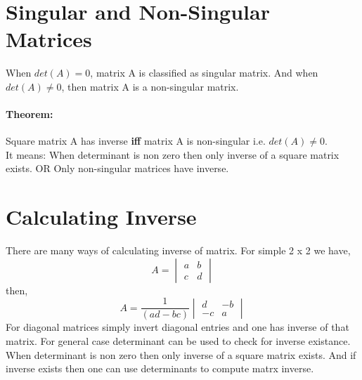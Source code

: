 \documentclass{article}
\begin{document}
\section{Singular and Non-Singular Matrices}
When $det(A)=0$, matrix A is classified as singular matrix. And when $det(A) \neq 0$, then matrix A is a non-singular matrix.
\paragraph{Theorem:}
Square matrix A has inverse \textbf{iff} matrix A is non-singular i.e. $det(A) \neq 0$.\\
It means: When determinant is non zero then only inverse of a square matrix exists. OR Only non-singular matrices have inverse.
\section{Calculating Inverse}
There are many ways of calculating inverse of matrix. For simple 2 x 2 we have,
\begin{equation*}
    A=
    \begin{vmatrix}
    a & b\\
    c &d
    \end{vmatrix}
\end{equation*}
then,
\begin{equation*}
    A=
    \frac{1}{(ad-bc)}
    \begin{vmatrix}
    d & -b\\
    -c & a
    \end{vmatrix}
\end{equation*}
For diagonal matrices simply invert diagonal entries and one has inverse of that matrix. For general case determinant can be used to check for inverse existance. When determinant is non zero then only inverse of a square matrix exists. And if inverse exists then one can use determinants to compute matrx inverse.
\end{document}
